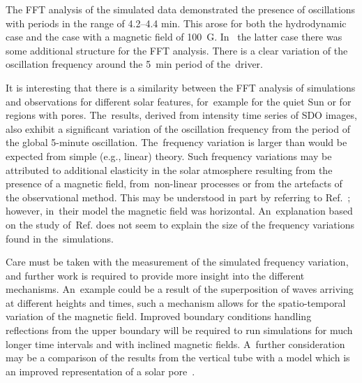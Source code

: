 \documentclass[physics,article,accept,pdftex,moreauthors]{Definitions/mdpi}
\begin{document}
The FFT analysis of the simulated data demonstrated the presence of oscillations with periods in the range of 4.2--4.4 min. This arose for both the hydrodynamic case and the case with a magnetic field of 100~G. In~ the latter case there was some additional structure for the FFT analysis. There is a clear variation of the oscillation frequency around the 5~min period of the~driver. 

It is interesting that there is a similarity between the FFT analysis  of simulations and observations for different solar features, for~example for the 
 {quiet} 
Sun or for regions with pores. The~results, derived from intensity time series of SDO images, also exhibit a significant variation of the oscillation frequency from the period of the global 5-minute oscillation.  The~frequency variation is larger than would be expected from  simple (e.g., linear) theory. Such frequency variations may be attributed to additional elasticity in the solar atmosphere resulting from the presence of a magnetic field, from~non-linear processes or from the artefacts of the observational method. This  may be understood in part by referring to 
 {Ref.}~\cite{Campbell1989}; however, in~their model the magnetic field was horizontal. An~explanation based on 
 the %
 {study} of~{Ref.}
\cite{Hindman1996} does not seem to explain the size of the frequency variations found in the~simulations.

 
  
  

 
 
Care must be taken with the measurement of the simulated frequency variation, and further work is required to provide more insight into the different mechanisms. An~example could be a result of the superposition of waves arriving at different heights and times, such a mechanism allows for the spatio-temporal variation of the   magnetic field. Improved boundary conditions handling reflections from the upper boundary  will be required to run simulations for much longer time intervals and with inclined magnetic fields. A~further consideration may be a comparison of the results from the vertical tube with a model which is an improved representation of a solar pore~\cite{Simon1970,Cameron2007}.
\end{document}
